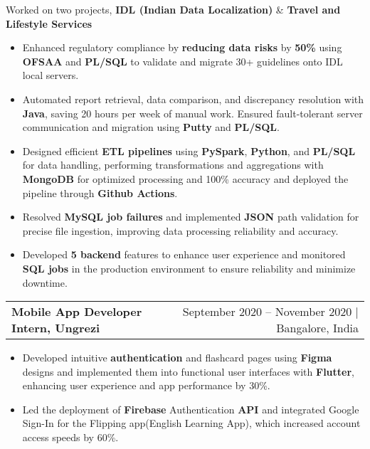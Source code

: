 \documentclass[10pt, legalpaper]{article}
\newenvironment{highlights}{
    \begin{itemize}[
        topsep=0.10 cm,
        parsep=0.10 cm,
        partopsep=0pt,
        itemsep=0pt,
        leftmargin=0 cm + 10pt
    ]
}{
    \end{itemize}
}
\newenvironment{onecolentry}{
    \par\noindent
}{
    \par
}
\begin{document}
\begin{onecolentry}

Worked on two projects, \textbf{IDL (Indian Data Localization)} \& \textbf{Travel and Lifestyle Services}
\vspace{-1mm}
    \begin{highlights}
        \item Enhanced regulatory compliance by \textbf{reducing data risks} by\textbf{ 50\%} using \textbf{OFSAA} and \textbf{PL/SQL} to validate and migrate 30+ guidelines onto IDL local servers.
        \item Automated report retrieval, data comparison, and discrepancy resolution with \textbf{Java}, saving 20 hours per week of manual work. Ensured fault-tolerant server communication and migration using \textbf{Putty} and \textbf{PL/SQL}.
        \item Designed efficient \textbf{ETL pipelines} using \textbf{PySpark}, \textbf{Python}, and \textbf{PL/SQL} for data handling, performing transformations and aggregations with \textbf{MongoDB} for optimized processing and 100\% accuracy and deployed the pipeline through \textbf{Github Actions}.
        \item Resolved \textbf{MySQL job failures} and implemented\textbf{ JSON} path validation for precise file ingestion, improving data processing reliability and accuracy.
        \item Developed\textbf{ 5 backend} features to enhance user experience and monitored \textbf{SQL jobs} in the production environment to ensure reliability and minimize downtime.
    \end{highlights}
\end{onecolentry}

\vspace{0.0 cm}

\begin{tabularx}{\textwidth}{@{}Xr@{}}
    \textbf{Mobile App Developer Intern, Ungrezi} & September 2020 – November 2020 | Bangalore, India \\
\end{tabularx}
\vspace{-5mm}
\begin{onecolentry}
    \begin{highlights}
        \item Developed intuitive \textbf{authentication} and flashcard pages using \textbf{Figma} designs and implemented them into functional user interfaces with \textbf{Flutter}, enhancing user experience and app performance by 30\%.
        \item Led the deployment of \textbf{Firebase} Authentication \textbf{API} and integrated Google Sign-In for the Flipping app(English Learning App), which increased account access speeds by 60\%.
    \end{highlights}
\end{onecolentry}
\end{document}
